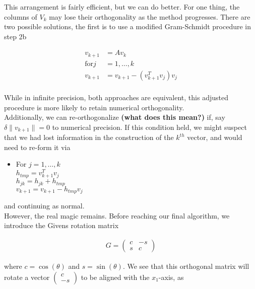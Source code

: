 \documentclass[11pt]{article}
\begin{document}
This arrangement is fairly efficient, but we can do better. For one thing, the columns of $V_k$ may lose their orthogonality as the method progresses. There are two possible solutions, the first is to use a modified Gram-Schmidt procedure in step 2b

\begin{align*}
  v_{k+1} &= A v_k \\
  \textrm{for} j &= 1, \dots, k \\
  v_{k+1} &= v_{k+1} - (v_{k+1}^Tv_j)v_j \\
\end{align*}

While in infinite precision, both approaches are equivalent, this adjusted procedure is more likely to retain numerical orthogonality. \\

Additionally, we can re-orthogonalize \textbf{(what does this mean?)} if, say $\delta \| v_{k+1} \| = 0$ to numerical precision. If this condition held, we might suspect that we had lost information in the construction of the $k^{th}$ vector, and would need to re-form it via

\begin{itemize}
\renewcommand{\labelitemi}{$\circ$}
\item For $j = 1, \dots, k$ \\
  $h_{tmp} = v_{k+1}^T v_j$ \\
  $h_{jk} = h_{jk} + h_{tmp}$ \\
  $v_{k+1} = v_{k+1} - h_{tmp}v_j$ \\
\end{itemize}

and continuing as normal. \\

However, the real magic remains. Before reaching our final algorithm, we introduce the Givens rotation matrix

\begin{align*}
  G = \begin{pmatrix} c & -s \\ s & c \end{pmatrix}
\end{align*}

where $c = \cos(\theta)$ and $s = \sin(\theta)$. We see that this orthogonal matrix will rotate a vector $\begin{pmatrix} c \\ -s \end{pmatrix}$ to be aligned with the $x_1$-axis, as
\end{document}
